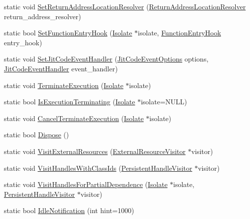 \begin{DoxyCompactItemize}
\item 
static void \hyperlink{classv8_1_1_v8_a7a9e8a96dcb3c3d306c0061b0a8e39c8}{Set\+Return\+Address\+Location\+Resolver} (\hyperlink{namespacev8_a8ce54c75241be41ff6a25e9944eefd2a}{Return\+Address\+Location\+Resolver} return\+\_\+address\+\_\+resolver)
\item 
static bool \hyperlink{classv8_1_1_v8_a156ba8ae8d0e4112725ad2dd410e280d}{Set\+Function\+Entry\+Hook} (\hyperlink{classv8_1_1_isolate}{Isolate} $\ast$isolate, \hyperlink{namespacev8_aaf07fb6bb13f295da3c6568938b7dec5}{Function\+Entry\+Hook} entry\+\_\+hook)
\item 
static void \hyperlink{classv8_1_1_v8_abf1b71bf2e3cb73fa44c6939bd70ab5e}{Set\+Jit\+Code\+Event\+Handler} (\hyperlink{namespacev8_a06f34fa4fa4cfc8518366808d1d461c1}{Jit\+Code\+Event\+Options} options, \hyperlink{namespacev8_a39243bc91e63d64d111452fdb98c4733}{Jit\+Code\+Event\+Handler} event\+\_\+handler)
\item 
static void \hyperlink{classv8_1_1_v8_a8ff3cfb774c8540cf7b2c3967d5755dd}{Terminate\+Execution} (\hyperlink{classv8_1_1_isolate}{Isolate} $\ast$isolate)
\item 
static bool \hyperlink{classv8_1_1_v8_a8e0ad59109f022ecca7121e2ea990997}{Is\+Execution\+Terminating} (\hyperlink{classv8_1_1_isolate}{Isolate} $\ast$isolate=N\+U\+L\+L)
\item 
static void \hyperlink{classv8_1_1_v8_ac2fb064870a2ca3bf6f7933c3dff6d85}{Cancel\+Terminate\+Execution} (\hyperlink{classv8_1_1_isolate}{Isolate} $\ast$isolate)
\item 
static bool \hyperlink{classv8_1_1_v8_a566450d632c0a63770682b9da3cae08d}{Dispose} ()
\item 
static void \hyperlink{classv8_1_1_v8_a1fd57739642c8304dc8a34dd283da840}{Visit\+External\+Resources} (\hyperlink{classv8_1_1_external_resource_visitor}{External\+Resource\+Visitor} $\ast$visitor)
\item 
static void \hyperlink{classv8_1_1_v8_a5bf6f26e51cd3e9d71a662fe7efa5206}{Visit\+Handles\+With\+Class\+Ids} (\hyperlink{classv8_1_1_persistent_handle_visitor}{Persistent\+Handle\+Visitor} $\ast$visitor)
\item 
static void \hyperlink{classv8_1_1_v8_ab2e242c45c73a0cee755e55acec71bd5}{Visit\+Handles\+For\+Partial\+Dependence} (\hyperlink{classv8_1_1_isolate}{Isolate} $\ast$isolate, \hyperlink{classv8_1_1_persistent_handle_visitor}{Persistent\+Handle\+Visitor} $\ast$visitor)
\item 
static bool \hyperlink{classv8_1_1_v8_abcafb07ace99c980e42662299eb9eb1d}{Idle\+Notification} (int hint=1000)

\end{DoxyCompactItemize}
